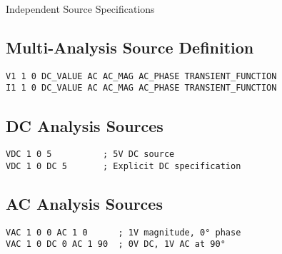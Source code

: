 \documentclass{beamer}
\begin{document}
\begin{frame}{Independent Source Specifications}
    \subsection{Multi-Analysis Source Definition}
    \begin{lstlisting}
V1 1 0 DC_VALUE AC AC_MAG AC_PHASE TRANSIENT_FUNCTION
I1 1 0 DC_VALUE AC AC_MAG AC_PHASE TRANSIENT_FUNCTION
    \end{lstlisting}
    
    \subsection{DC Analysis Sources}
    \begin{lstlisting}
VDC 1 0 5          ; 5V DC source
VDC 1 0 DC 5       ; Explicit DC specification
    \end{lstlisting}
    
    \subsection{AC Analysis Sources}
    \begin{lstlisting}
VAC 1 0 0 AC 1 0      ; 1V magnitude, 0° phase
VAC 1 0 DC 0 AC 1 90  ; 0V DC, 1V AC at 90°
    \end{lstlisting}
\end{frame}
\end{document}
